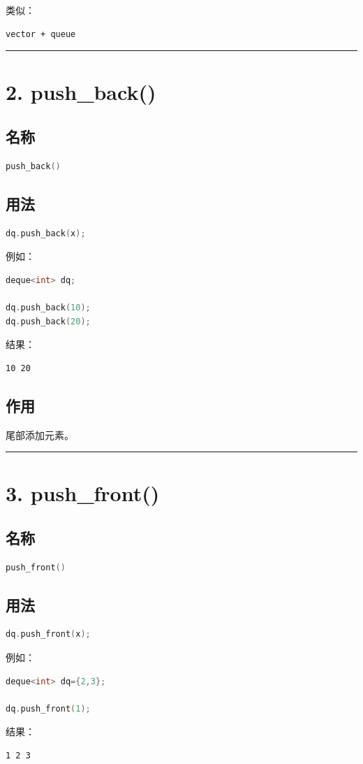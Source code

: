 \documentclass[9pt,twocolumn]{extarticle}
\begin{document}
类似：
\begin{lstlisting}
vector + queue
\end{lstlisting}

\noindent\rule{\linewidth}{0.4pt}

\section{2. push\_back()}

\subsection{名称}
\begin{lstlisting}[language=C++]
push_back()
\end{lstlisting}

\subsection{用法}
\begin{lstlisting}[language=C++]
dq.push_back(x);
\end{lstlisting}
例如：
\begin{lstlisting}[language=C++]
deque<int> dq;

dq.push_back(10);
dq.push_back(20);
\end{lstlisting}
结果：
\begin{lstlisting}
10 20
\end{lstlisting}

\subsection{作用}
尾部添加元素。

\noindent\rule{\linewidth}{0.4pt}

\section{3. push\_front()}

\subsection{名称}
\begin{lstlisting}[language=C++]
push_front()
\end{lstlisting}

\subsection{用法}
\begin{lstlisting}[language=C++]
dq.push_front(x);
\end{lstlisting}
例如：
\begin{lstlisting}[language=C++]
deque<int> dq={2,3};

dq.push_front(1);
\end{lstlisting}
结果：
\begin{lstlisting}
1 2 3
\end{lstlisting}
\end{document}
